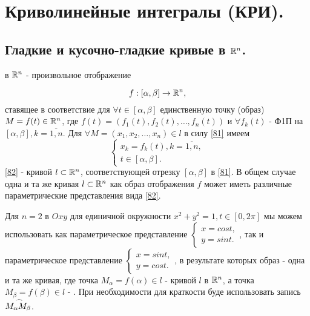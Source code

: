 \section{Криволинейные интегралы (КРИ).}

\subsection{Гладкие и кусочно-гладкие кривые в $ \mathbb{R}^n $.}

\begin{definition}
	 в $ \mathbb{R}^n $ - произвольное отображение
\end{definition} 
\begin{equation}
\label{81}
f: [\alpha, \beta] \to \mathbb{R}^n,
\end{equation}
ставящее в соответствие для $\forall t \in [\alpha, \beta]$ единственную точку (образ) $M = f(t) \in \mathbb{R}^n$, где $f(t) = (f_1(t), f_2(t), \ldots, f_n(t))$ и $\forall f_k(t)$ - Ф1П на $[\alpha, \beta], k = \overline{1,n}$. Для $\forall M = (x_1, x_2, \ldots, x_n) \in l$ в силу \eqref{81} имеем
\begin{equation}
\label{82}
\begin{cases}
x_k = f_k(t), k = \overline{1,n},\\
t \in [\alpha, \beta].
\end{cases}
\end{equation}
\eqref{82} -  кривой $l \subset \mathbb{R}^n$, соответствующей отрезку $[\alpha, \beta]$ в \eqref{81}. В общем случае одна и та же кривая $l \subset \mathbb{R}^n$ как образ отображения $f$ может иметь различные параметрические представления вида \eqref{82}.

Для $n = 2$ в $Oxy$ для единичной окружности $x^2 + y^2 = 1, t \in [0, 2\pi]$ мы можем использовать как параметрическое представление 
$\begin{cases}
x = cos t,\\
y = sin t.
\end{cases}$, так и параметрическое представление 
$\begin{cases}
x = sin t,\\
y = cos t.
\end{cases}$, в результате которых образ - одна и та же кривая, где точка $M_\alpha = f(\alpha) \in l$ -  кривой $l$ в $\mathbb{R}^n$, а точка $ M_\beta = f(\beta) \in l$ - . При необходимости для краткости буде использовать запись $\arc{M_\alpha M_\beta}$.

